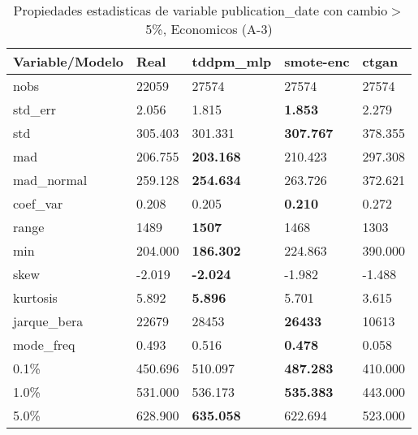 \begin{table}[H]
\centering
\fontsize{8}{14}\selectfont
\caption{Propiedades estadisticas de variable publication\_date con cambio\ensuremath{>}5\%, Economicos (A-3)}
\label{table-stats-economicos-a-3-publication_date-short}
\begin{tabular}{|l|m{10em}|m{10em}|m{10em}|m{10em}|}
\hline
 \rowcolor[gray]{0.8}
Variable/Modelo & Real & tddpm\_mlp & smote-enc & ctgan \\
\hline nobs & 22059 & 27574 & 27574 & 27574 \\
\hline std\_err & 2.056 & \cellcolor[rgb]{0.9, 0.54, 0.52} 1.815 & \bfseries 1.853 & 2.279 \\
\hline std & 305.403 & 301.331 & \bfseries 307.767 & \cellcolor[rgb]{0.9, 0.54, 0.52} 378.355 \\
\hline mad & 206.755 & \bfseries 203.168 & 210.423 & \cellcolor[rgb]{0.9, 0.54, 0.52} 297.308 \\
\hline mad\_normal & 259.128 & \bfseries 254.634 & 263.726 & \cellcolor[rgb]{0.9, 0.54, 0.52} 372.621 \\
\hline coef\_var & 0.208 & 0.205 & \bfseries 0.210 & \cellcolor[rgb]{0.9, 0.54, 0.52} 0.272 \\
\hline range & 1489 & \bfseries 1507 & 1468 & \cellcolor[rgb]{0.9, 0.54, 0.52} 1303 \\
\hline min & 204.000 & \bfseries 186.302 & 224.863 & \cellcolor[rgb]{0.9, 0.54, 0.52} 390.000 \\
\hline skew & -2.019 & \bfseries -2.024 & -1.982 & \cellcolor[rgb]{0.9, 0.54, 0.52} -1.488 \\
\hline kurtosis & 5.892 & \bfseries 5.896 & 5.701 & \cellcolor[rgb]{0.9, 0.54, 0.52} 3.615 \\
\hline jarque\_bera & 22679 & 28453 & \bfseries 26433 & \cellcolor[rgb]{0.9, 0.54, 0.52} 10613 \\
\hline mode\_freq & 0.493 & 0.516 & \bfseries 0.478 & \cellcolor[rgb]{0.9, 0.54, 0.52} 0.058 \\
\hline 0.1\% & 450.696 & \cellcolor[rgb]{0.9, 0.54, 0.52} 510.097 & \bfseries 487.283 & 410.000 \\
\hline 1.0\% & 531.000 & 536.173 & \bfseries 535.383 & \cellcolor[rgb]{0.9, 0.54, 0.52} 443.000 \\
\hline 5.0\% & 628.900 & \bfseries 635.058 & 622.694 & \cellcolor[rgb]{0.9, 0.54, 0.52} 523.000 \\
\hline
\end{tabular}
\end{table}
